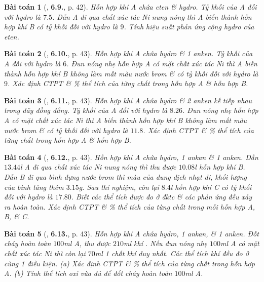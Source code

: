 \documentclass{article}
\numberwithin{equation}{section}
\newtheorem{baitoan}{Bài toán}[section]
\begin{document}
\begin{baitoan}[\cite{SBT_Hoa_Hoc_11_co_ban}, \textbf{6.9.}, p. 42]
	Hỗn hợp khí A chứa eten \& hydro. Tỷ khối của A đối với hydro là $7.5$. Dẫn A đi qua chất xúc tác \emph{Ni} nung nóng thì A biến thành hỗn hợp khí B có tỷ khối đối với hydro là $9$. Tính hiệu suất phản ứng cộng hydro của eten.
\end{baitoan}

\begin{baitoan}[\cite{SBT_Hoa_Hoc_11_co_ban}, \textbf{6.10.}, p. 43]
	Hỗn hợp khí A chứa hydro \& 1 anken. Tỷ khối của A đối với hydro là $6$. Đun nóng nhẹ hỗn hợp A có mặt chất xúc tác \emph{Ni} thì A biến thành hỗn hợp khí B không làm mất màu nước brom \& có tỷ khối đối với hydro là $9$. Xác định CTPT \& \% thể tích của từng chất trong hỗn hợp A \& hỗn hợp B.
\end{baitoan}

\begin{baitoan}[\cite{SBT_Hoa_Hoc_11_co_ban}, \textbf{6.11.}, p. 43]
	Hỗn hợp khí A chứa hydro \& 2 anken kế tiếp nhau trong dãy đồng đẳng. Tỷ khối của A đối với hydro là $8.26$. Đun nóng nhẹ hỗn hợp A có mặt chất xúc tác \emph{Ni} thì A biến thành hỗn hợp khí B không làm mất màu nước brom \& có tỷ khối đối với hydro là $11.8$. Xác định CTPT \& \% thể tích của từng chất trong hỗn hợp A \& hỗn hợp B.
\end{baitoan}

\begin{baitoan}[\cite{SBT_Hoa_Hoc_11_co_ban}, \textbf{6.12.}, p. 43]
	Hỗn hợp khí A chứa hydro, 1 ankan \& 1 anken. Dẫn $13.44$\emph{l} A đi qua chất xúc tác \emph{Ni} nung nóng thì thu được $10.08$\emph{l} hỗn hợp khí B. Dẫn B đi qua bình đựng nước brom thì màu của dung dịch nhạt đi, khối lượng của bình tăng thêm $3.15$\emph{g}. Sau thí nghiệm, còn lại $8.4$\emph{l} hỗn hợp khí C có tỷ khối đối với hydro là $17.80$. Biết các thể tích được đo ở đktc \& các phản ứng đều xảy ra hoàn toàn. Xác định CTPT \& \% thể tích của từng chất trong mỗi hỗn hợp A, B, \& C.
\end{baitoan}

\begin{baitoan}[\cite{SBT_Hoa_Hoc_11_co_ban}, \textbf{6.13.}, p. 43]
	Hỗn hợp khí A chứa hydro, 1 ankan, \& 1 anken. Đốt cháy hoàn toàn $100$\emph{ml} A, thu được $210$\emph{ml} khí \emph{}. Nếu đun nóng nhẹ $100$\emph{ml} A có mặt chất xúc tác \emph{Ni} thì còn lại $70$\emph{ml} 1 chất khí duy nhất. Các thể  tích khí đều đo ở cùng 1 điều kiện. (a) Xác định CTPT \& \% thể tích của từng chất trong hỗn hợp A. (b) Tính thể tích oxi vừa đủ để đốt cháy hoàn toàn $100$\emph{ml} A.
\end{baitoan}
\end{document}
